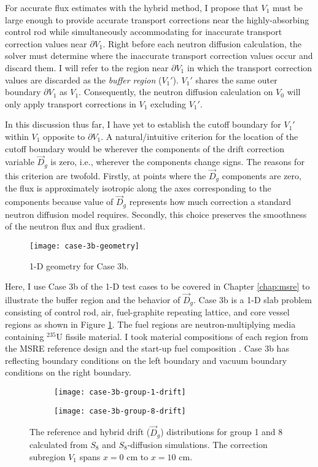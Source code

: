 For accurate flux estimates with the hybrid method, I propose that $V_1$ must be large enough to
provide accurate transport corrections near the highly-absorbing control rod while simultaneously
accommodating for inaccurate transport correction values near $\partial V_1$. Right before each
neutron diffusion calculation, the solver must determine where the inaccurate transport correction
values occur and discard them. I will refer to the region near $\partial V_1$ in which the
transport correction values are discarded as the \textit{buffer region} ($V_1'$).
$V_1'$ shares the same outer boundary $\partial V_1$ as $V_1$. Consequently, the neutron
diffusion calculation on $V_0$ will only apply transport corrections in $V_1$ excluding $V_1'$.

In this discussion thus far, I have yet to establish the cutoff boundary for $V_1'$ within $V_1$
opposite to $\partial V_1$. A natural/intuitive criterion for the location of the cutoff boundary
would be wherever the components of the drift correction variable $\vec{D}_g$ is zero, i.e.,
wherever the components change signs. The reasons for this criterion are twofold. Firstly, at
points where the $\vec{D}_g$ components are zero, the flux is approximately isotropic along the
axes corresponding to the components because value of $\vec{D}_g$ represents how much correction a
standard neutron diffusion model requires. Secondly, this choice preserves the smoothness of the
neutron flux and flux gradient.
%
\begin{figure}[htb!]
	\centering
	\texttt{[image: case-3b-geometry]}
	\caption{1-D geometry for Case 3b.}
	\label{fig:3b-geometry}
\end{figure}

Here, I use Case 3b of the 1-D test cases to be covered in Chapter \ref{chap:msre}
to illustrate the buffer region and the behavior of $\vec{D}_g$. Case 3b is a 1-D slab problem
consisting of control rod, air, fuel-graphite repeating lattice, and core vessel regions as shown
in Figure \ref{fig:3b-geometry}. The fuel regions are neutron-multiplying media containing
$^\text{235}$U fissile material. I took material compositions of each region from the \gls{MSRE}
reference design and the start-up fuel composition \cite{fratoni_molten_2020}.
Case 3b has reflecting boundary conditions on the left boundary and vacuum boundary conditions on
the right boundary.
%
\begin{figure}[htb!]
    \centering
    \begin{subfigure}[t]{.49\textwidth}
        \centering
        \texttt{[image: case-3b-group-1-drift]}
    \end{subfigure}
    \hfill
    \begin{subfigure}[t]{.49\textwidth}
        \centering
        \texttt{[image: case-3b-group-8-drift]}
    \end{subfigure}
    \caption{The reference and hybrid drift ($\vec{D}_g$) distributions for group 1 and 8 calculated
      from $S_8$ and $S_8$-diffusion simulations. The correction subregion $V_1$ spans $x=0$ cm to
      $x=10$ cm.}
    \label{fig:3b-drift}
\end{figure}

